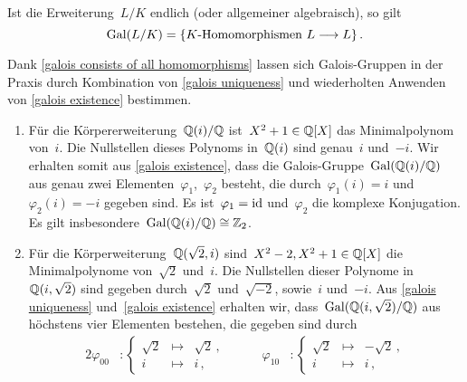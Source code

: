 \begin{corollary}
  \label{galois consists of all homomorphisms}
  Ist die Erweiterung~$L/K$ endlich (oder allgemeiner algebraisch), so gilt
  \[
    \Gal(L/K)
    =
    \{
      \text{\Homomorphismen{$K$}~$L \to L$}
    \} \,.
  \]
\end{corollary}

Dank \cref{galois consists of all homomorphisms} lassen sich Galois-Gruppen in der Praxis durch Kombination von \cref{galois uniqueness} und wiederholten Anwenden von \cref{galois existence} bestimmen.

\begin{example}
  \leavevmode
  \begin{enumerate}
    \item
      Für die Körpererweiterung~$\mathbb{Q}(i) / \mathbb{Q}$ ist~$X^2 + 1 \in \mathbb{Q}[X]$ das Minimalpolynom von~$i$.
      Die Nullstellen dieses Polynoms in~$\mathbb{Q}(i)$ sind genau~$i$ und~$-i$.
      Wir erhalten somit aus \cref{galois existence}, dass die Galois-Gruppe~$\operatorname{Gal}(\mathbb{Q}(i) / \mathbb{Q})$ aus genau zwei Elementen~$\varphi_1$,~$\varphi_2$ besteht, die durch~$\varphi_1(i) = i$ und~$\varphi_2(i) = -i$ gegeben sind.
      Es ist~$\varphi_1 = \mathrm{id}$ und~$\varphi_2$ die komplexe Konjugation.
      Es gilt insbesondere~$\operatorname{Gal}( \mathbb{Q}(i) / \mathbb{Q} ) \cong \mathbb{Z}_2$.
    \item
      Für die Körperweiterung~$\mathbb{Q}(\sqrt{2}, i)$ sind~$X^2 - 2, X^2 + 1 \in \mathbb{Q}[X]$ die Minimalpolynome von~$\sqrt{2}$ und~$i$.
      Die Nullstellen dieser Polynome in~$\mathbb{Q}(i, \sqrt{2})$ sind gegeben durch~$\sqrt{2}$ und~$\sqrt{-2}$, sowie~$i$ und~$-i$.
      Aus \cref{galois uniqueness} und~\cref{galois existence} erhalten wir, dass~$\operatorname{Gal}( \mathbb{Q}(i, \sqrt{2}) / \mathbb{Q} )$ aus höchstens vier Elementen bestehen, die gegeben sind durch
      \begin{alignat*}{2}
        \varphi_{00}
        &\colon
        \left\{
          \begin{array}{rcr}
            \sqrt{2}  &\mapsto& \sqrt{2} \,,
            \\
            i         &\mapsto& i \,,
          \end{array}
        \right.
        &
        \qquad
        \varphi_{10}
        &\colon
        \left\{
          \begin{array}{rcr}
            \sqrt{2}  &\mapsto& -\sqrt{2} \,,
            \\
            i         &\mapsto& i \,,
          \end{array}

\end{alignat*}
\end{enumerate}
\end{example}
